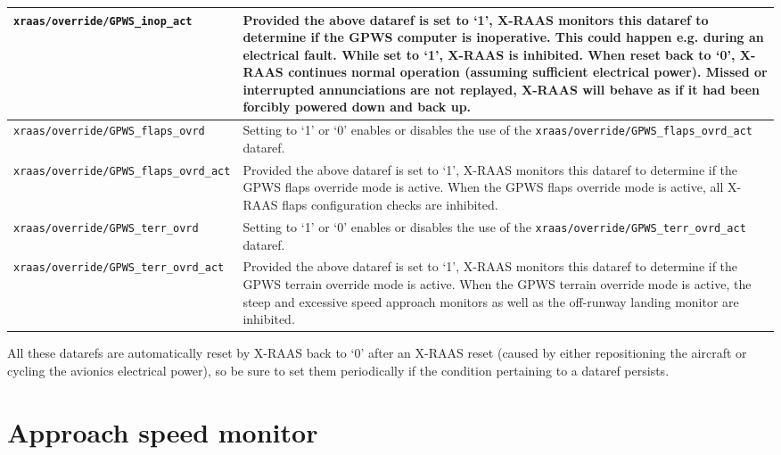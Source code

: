 \documentclass[a4paper,12pt]{article}
\newcommand{\dataref}[1]{\texttt{#1}}
\begin{document}
{\begin{center}
\begin{supertabular}{|p{0.42\textwidth}|p{0.51\textwidth}|}
\hline

\dataref{xraas/override/GPWS\_inop\_act} &
Provided the above dataref is set to `1', X-RAAS monitors this dataref to
determine if the GPWS computer is inoperative. This could happen e.g.
during an electrical fault. While set to `1', X-RAAS is inhibited. When
reset back to `0', X-RAAS continues normal operation (assuming sufficient
electrical power). Missed or interrupted annunciations are not replayed,
X-RAAS will behave as if it had been forcibly powered down and back up. \\

\hline

\dataref{xraas/override/GPWS\_flaps\_ovrd} &
Setting to `1' or `0' enables or disables the use of the
\dataref{xraas/override/GPWS\_flaps\_ovrd\_act} dataref. \\

\hline

\dataref{xraas/override/GPWS\_flaps\_ovrd\_act} &
Provided the above dataref is set to `1', X-RAAS monitors this dataref to
determine if the GPWS flaps override mode is active. When the GPWS flaps
override mode is active, all X-RAAS flaps configuration checks are
inhibited. \\

\hline

\dataref{xraas/override/GPWS\_terr\_ovrd} &
Setting to `1' or `0' enables or disables the use of the
\dataref{xraas/override/GPWS\_terr\_ovrd\_act} dataref. \\

\hline

\dataref{xraas/override/GPWS\_terr\_ovrd\_act} &
Provided the above dataref is set to `1', X-RAAS monitors this dataref to
determine if the GPWS terrain override mode is active. When the GPWS
terrain override mode is active, the steep and excessive speed approach
monitors as well as the off-runway landing monitor are inhibited. \\

\end{supertabular}
\end{center}
} %

\noindent All these datarefs are automatically reset by X-RAAS back to
`0' after an X-RAAS reset (caused by either repositioning the aircraft or
cycling the avionics electrical power), so be sure to set them
periodically if the condition pertaining to a dataref persists.

\section{Approach speed monitor}
\label{EASMon}
\end{document}
